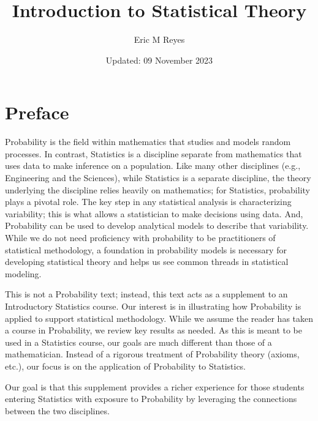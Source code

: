 \documentclass[
  letterpaper,
  DIV=11,
  numbers=noendperiod]{scrreprt}
\title{Introduction to Statistical Theory}
\author{Eric M Reyes}
\date{Updated: 09 November 2023}
\renewcommand*\contentsname{Table of contents}
\newcommand\contentsname{Table of contents}
\theoremstyle{plain}
\theoremstyle{definition}
\theoremstyle{definition}
\theoremstyle{remark}
\begin{document}
\maketitle
\ifdefined\Shaded\renewenvironment{Shaded}{\begin{tcolorbox}[sharp corners, borderline west={3pt}{0pt}{shadecolor}, boxrule=0pt, frame hidden, interior hidden, enhanced, breakable]}{\end{tcolorbox}}\fi

\renewcommand*\contentsname{Table of contents}
{
\hypersetup{linkcolor=}
\setcounter{tocdepth}{2}
\tableofcontents
}

\hypertarget{preface}{%
\chapter*{Preface}\label{preface}}


Probability is the field within mathematics that studies and models
random processes. In contrast, Statistics is a discipline separate from
mathematics that uses data to make inference on a population. Like many
other disciplines (e.g., Engineering and the Sciences), while Statistics
is a separate discipline, the theory underlying the discipline relies
heavily on mathematics; for Statistics, probability plays a pivotal
role. The key step in any statistical analysis is characterizing
variability; this is what allows a statistician to make decisions using
data. And, Probability can be used to develop analytical models to
describe that variability. While we do not need proficiency with
probability to be practitioners of statistical methodology, a foundation
in probability models is necessary for developing statistical theory and
helps us see common threads in statistical modeling.

This is not a Probability text; instead, this text acts as a supplement
to an Introductory Statistics course. Our interest is in illustrating
how Probability is applied to support statistical methodology. While we
assume the reader has taken a course in Probability, we review key
results as needed. As this is meant to be used in a Statistics course,
our goals are much different than those of a mathematician. Instead of a
rigorous treatment of Probability theory (axioms, etc.), our focus is on
the application of Probability to Statistics.

Our goal is that this supplement provides a richer experience for those
students entering Statistics with exposure to Probability by leveraging
the connections between the two disciplines.
\end{document}
